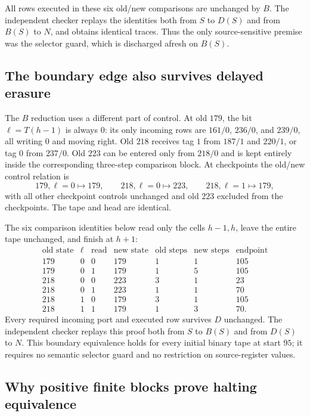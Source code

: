 All rows executed in these six old/new comparisons are unchanged
by $B$.  The independent checker replays the identities both from
$S$ to $D(S)$ and from $B(S)$ to $N$, and obtains identical traces.
Thus the only source-sensitive premise was the selector guard,
which is discharged afresh on $B(S)$.

\subsection{The boundary edge also survives delayed erasure}

The $B$ reduction uses a different part of control.  At old $179$,
the bit $\ell=T(h-1)$ is always $0$: its only incoming rows are
$161/0$, $236/0$, and $239/0$, all writing $0$ and moving right.
Old $218$ receives tag $1$ from $187/1$ and $220/1$, or tag $0$
from $237/0$.  Old $223$ can be entered only from $218/0$ and is
kept entirely inside the corresponding three-step comparison block.
At checkpoints the old/new control relation is
\[
179,\ell=0\mapsto179,\qquad
218,\ell=0\mapsto223,\qquad
218,\ell=1\mapsto179,
\]
with all other checkpoint controls unchanged and old $223$
excluded from the checkpoints.  The tape and head are identical.

The six comparison identities below read only the cells $h-1,h$,
leave the entire tape unchanged, and finish at $h+1$:
\[
\begin{array}{r|r|r|r|r|r|r}
\text{old state}&\ell&\text{read}&\text{new state}&
\text{old steps}&\text{new steps}&\text{endpoint}\\\hline
179&0&0&179&1&1&105\\
179&0&1&179&1&5&105\\
218&0&0&223&3&1&23\\
218&0&1&223&1&1&70\\
218&1&0&179&3&1&105\\
218&1&1&179&1&3&70.
\end{array}
\]
Every required incoming port and executed row survives $D$ unchanged.
The independent checker replays this proof both from $S$ to $B(S)$
and from $D(S)$ to $N$.  This boundary equivalence holds for every
initial binary tape at start $95$; it requires no semantic selector
guard and no restriction on source-register values.

\subsection{Why positive finite blocks prove halting equivalence}

